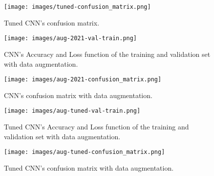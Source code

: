 \begin{figure}[ht]
\centering
\texttt{[image: images/tuned-confusion\_matrix.png]}
\caption{Tuned CNN's confusion matrix.}
\label{fig:cf_tuned}
\end{figure}

\begin{figure}[ht]
\centering
\texttt{[image: images/aug-2021-val-train.png]}
\caption{CNN's Accuracy and Loss function of the training and validation set with data augmentation.}
\label{fig:Acc_Loss_2021_aug}
\end{figure}

\begin{figure}[ht]
\centering
\texttt{[image: images/aug-2021-confusion\_matrix.png]}
\caption{CNN's confusion matrix with data augmentation.}
\label{fig:cf_2021_aug}
\end{figure}

\begin{figure}[ht]
\centering
\texttt{[image: images/aug-tuned-val-train.png]}
\caption{Tuned CNN's Accuracy and Loss function of the training and validation set with data augmentation.}
\label{fig:Acc_Loss_tuned_aug}
\end{figure}

\begin{figure}[ht]
\centering
\texttt{[image: images/aug-tuned-confusion\_matrix.png]}
\caption{Tuned CNN's confusion matrix with data augmentation.}
\label{fig:cf_tuned_aug}
\end{figure}
